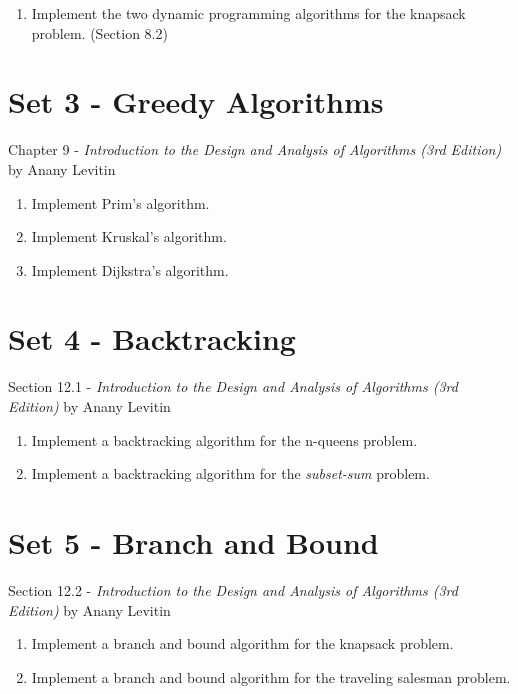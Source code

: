 \documentclass{article}
\begin{document}
\begin{enumerate}
    \item Implement the two dynamic programming algorithms for the knapsack problem. (Section 8.2)
\end{enumerate}

\section{Set 3 - Greedy Algorithms}
Chapter 9 - \textit{Introduction to the Design and Analysis of Algorithms (3rd Edition)} by Anany Levitin

\begin{enumerate}
    \item Implement Prim's algorithm.
    \item Implement Kruskal's algorithm.
    \item Implement Dijkstra's algorithm.
\end{enumerate}

\section{Set 4 - Backtracking}
Section 12.1 - \textit{Introduction to the Design and Analysis of Algorithms (3rd Edition)} by Anany Levitin

\begin{enumerate}
    \item Implement a backtracking algorithm for the n-queens problem.
    \item Implement a backtracking algorithm for the \textit{subset-sum} problem.
\end{enumerate}

\section{Set 5 - Branch and Bound}
Section 12.2 - \textit{Introduction to the Design and Analysis of Algorithms (3rd Edition)} by Anany Levitin

\begin{enumerate}
    \item Implement a branch and bound algorithm for the knapsack problem.
    \item Implement a branch and bound algorithm for the traveling salesman problem.  
\end{enumerate}


%
%
\end{document}
